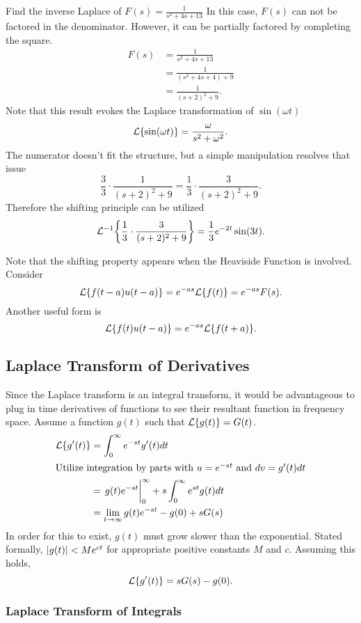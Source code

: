 \documentclass[../notes.tex]{subfiles}
\begin{document}
\begin{example}{Find the inverse Laplace of $F(s) = \frac{1}{s^2 + 4s + 13}$}
In this case, $F(s)$ can not be factored in the denominator. However, it can be partially factored by completing the square.
\begin{align*}
    F(s) &= \frac{1}{s^2 + 4s + 13} \\
    &= \frac{1}{(s^2 + 4s + 4) + 9} \\
    &= \frac{1}{(s+2)^2 + 9}
.\end{align*}
Note that this result evokes the Laplace transformation of $ \sin(\omega t)$
\[
\mathcal{L}\qty{ \sin(\omega t) } = \frac{\omega}{s^2 + \omega^2}
.\]
The numerator doesn't fit the structure, but a simple manipulation resolves that issue
\[
\frac{3}{3}\cdot \frac{1}{(s+2)^2 + 9} = \frac{1}{3} \cdot \frac{3}{(s+2)^2 + 9}
.\]
Therefore the shifting principle can be utilized
\[
    \mathcal{L}^{-1}\qty{ \frac{1}{3} \cdot \frac{3}{(s+2)^2 + 9} } = \frac{1}{3} e^{-2t} \sin(3t)
.\]
\end{example}

Note that the shifting property appears when the Heaviside Function is involved. Consider
\[
\mathcal{L}\qty{ f(t-a)u(t-a) } = e^{-as}\mathcal{L}\qty{ f(t) } = e^{-as} F(s)
.\]
Another useful form is
\[
\mathcal{L}\qty{ f(t)u(t-a) } = e^{-as} \mathcal{L}\qty{ f(t+a) }
.\]

\subsection{Laplace Transform of Derivatives}

Since the Laplace transform is an integral transform, it would be advantageous to plug in time derivatives of functions to see their resultant function in frequency space. Assume a function $g(t)$ such that  $\mathcal{L}\qty{ g(t) } = G(t)$.
 \begin{align*}
     \laplace{g'(t)} &= \int_0^\infty e^{-st} g'(t) dt \\
    \intertext{Utilize integration by parts with $u=e^{-st}$ and $dv = g'(t)dt$}
    &= \eval{g(t)e^{-st}}_0^{\infty} + s \int_0^{\infty} e^{st} g(t) dt \\
    &= \lim_{t \to \infty} g(t)e^{-st} - g(0) + s G(s)
 \end{align*}
In order for this to exist, $g(t)$ must grow slower than the exponential. Stated formally, $\qty| g(t) | < Me^{ct}$ for appropriate positive constants $M$ and $c$. Assuming this holds,
 \[
     \mathcal{L}\qty{ g'(t) } = sG(s) - g(0)
.\]

\subsubsection{Laplace Transform of Integrals}
\end{document}
